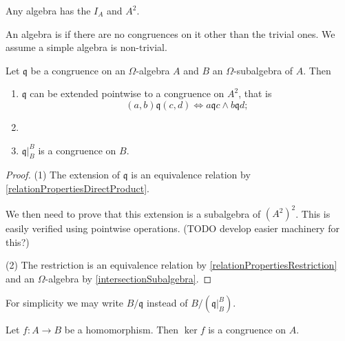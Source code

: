 \begin{example}
Any algebra has the  $I_A$ and $A^2$.
\end{example}

An algebra is  if there are no congruences on it other than the trivial ones. We assume a simple algebra is non-trivial.

\begin{lemma} \label{basicCongruenceLemma}
Let $\mathfrak{q}$ be a congruence on an $\Omega$-algebra $A$ and $B$ an $\Omega$-subalgebra of $A$. Then
\begin{enumerate}
\item $\mathfrak{q}$ can be extended pointwise to a congruence on $A^2$, that is
\[ (a,b)\mathfrak{q}(c,d) \iff a\mathfrak{q}c \land b\mathfrak{q}d; \]
\item 
\item $\mathfrak{q}|_B^B$ is a congruence on $B$.
\end{enumerate}
\end{lemma}
\begin{proof}
(1) The extension of $\mathfrak{q}$ is an equivalence relation by \ref{relationPropertiesDirectProduct}.

We then need to prove that this extension is a subalgebra of $(A^2)^2$. This is easily verified using pointwise operations. (TODO develop easier machinery for this?)

(2) The restriction is an equivalence relation by \ref{relationPropertiesRestriction} and an $\Omega$-algebra by \ref{intersectionSubalgebra}.
\end{proof}
For simplicity we may write $B/\mathfrak{q}$ instead of $B/(\mathfrak{q}|_B^B)$.

\begin{proposition}
Let $f:A\to B$ be a homomorphism. Then $\ker f$ is a congruence on $A$.
\end{proposition}

